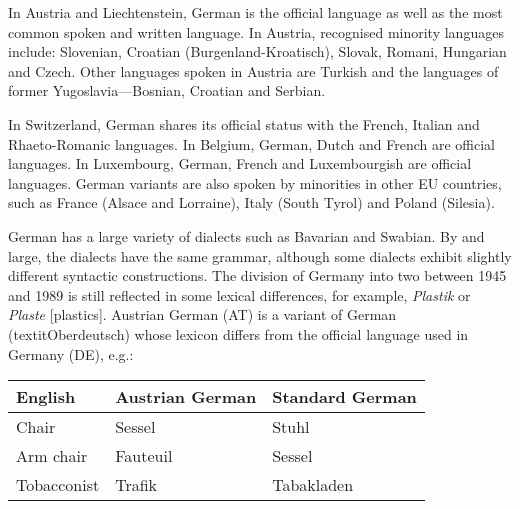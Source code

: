 \documentclass[]{../metanetpaper}
\begin{document}
\begin{Parallel}[c]{80mm}{80mm}
{    In Austria and Liechtenstein, German is the official language as well as the most common spoken and written language. In Austria, recognised minority languages include: Slovenian, Croatian (Burgenland-Kroatisch), Slovak, Romani, Hungarian and Czech. Other languages spoken in Austria are Turkish and the languages of former Yugoslavia—Bosnian, Croatian and Serbian.

    In Switzerland, German shares its official status with the French, Italian and Rhaeto-Romanic languages. In Belgium, German, Dutch and French are official languages. In Luxembourg, German, French and Luxembourgish are official languages. German variants are also spoken by minorities in other EU countries, such as France (Alsace and Lorraine), Italy (South Tyrol) and Poland (Silesia).

    German has a large variety of dialects such as Bavarian and Swabian. By and large, the dialects have the same grammar, although some dialects exhibit slightly different syntactic constructions. The division of Germany into two between 1945 and 1989 is still reflected in some lexical differences, for example, \textit{Plastik} or \textit{Plaste} {[}plastics{]}.
    Austrian German (AT) is a variant of German (textit{Oberdeutsch}) whose lexicon differs from the official language used in Germany (DE), e.g.:
  }
  \ParallelPar

  \begin{tabular*}{\textwidth}{l|l|l}
    \hline
    \textbf{English} & \textbf{Austrian German} & \textbf{Standard German}\\
    \hline
    Chair & Sessel & Stuhl\\
    \hline
    Arm chair & Fauteuil & Sessel\\
    \hline
    Tobacconist & Trafik & Tabakladen\\
    \hline
  \end{tabular*}



\end{Parallel}
\end{document}
